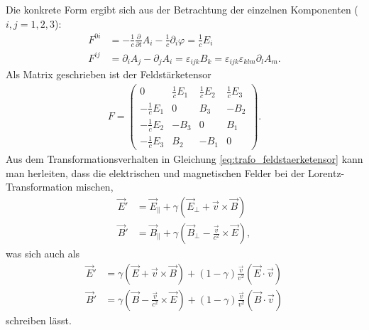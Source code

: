 Die konkrete Form ergibt sich aus der Betrachtung der einzelnen Komponenten ($i,j=1,2,3$):
\begin{align*}
    F^{0i} & = -\frac{1}{c} \frac{\partial}{\partial t}A_i-\frac{1}{c}\partial_i \varphi = \frac{1}{c}E_i                \\
    F^{ij} & = \partial_i A_j-\partial_j A_i = \varepsilon_{ijk} B_k = \varepsilon_{ijk} \varepsilon_{klm}\partial_l A_m.
\end{align*}
Als Matrix geschrieben ist der Feldstärketensor
\begin{align*}
    F=\begin{pmatrix}
          0               & \frac{1}{c}E_1 & \frac{1}{c}E_2 & \frac{1}{c}E_3 \\
          -\frac{1}{c}E_1 & 0              & B_3            & -B_2           \\
          -\frac{1}{c}E_2 & -B_3           & 0              & B_1            \\
          -\frac{1}{c}E_3 & B_2            & -B_1           & 0
      \end{pmatrix}.
\end{align*}
Aus dem Transformationsverhalten in Gleichung \eqref{eq:trafo_feldstaerketensor} kann man herleiten, dass die elektrischen und magnetischen Felder bei der Lorentz-Transformation mischen,
\begin{align*}
    \vec E' & = \vec E_\parallel + \gamma(\vec E_\perp + \vec v\times \vec B)              \\
    \vec B' & = \vec B_\parallel + \gamma(\vec B_\perp - \frac{\vec v}{c^2}\times \vec E),
\end{align*}
was sich auch als
\begin{align*}
    \vec E' & = \gamma(\vec E + \vec v\times \vec B) +(1-\gamma)\frac{\vec v}{v^2}\left(\vec E\cdot \vec v\right)             \\
    \vec B' & = \gamma(\vec B - \frac{\vec v}{c^2}\times \vec E) +(1-\gamma)\frac{\vec v}{v^2}\left(\vec B\cdot \vec v\right)
\end{align*}
schreiben lässt.


